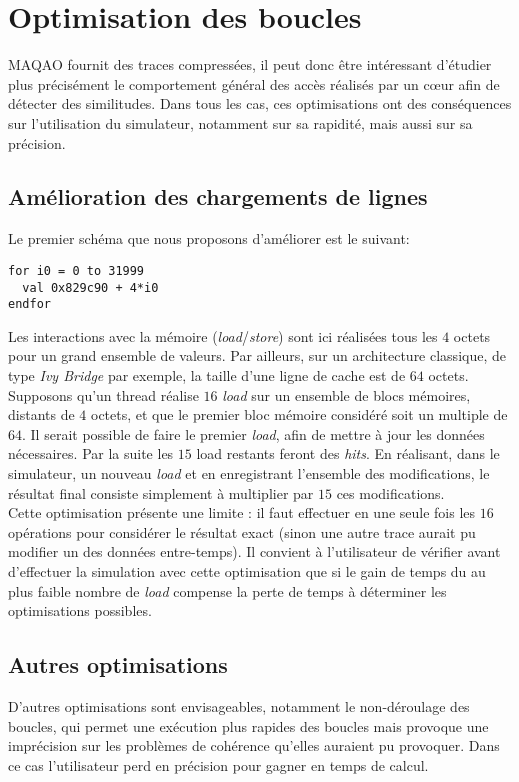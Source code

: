\section{Optimisation des boucles}

\textsc{MAQAO} fournit des traces compressées, il peut donc être intéressant d'étudier plus précisément le comportement général des accès réalisés par un c{\oe}ur afin de détecter des similitudes. Dans tous les cas, ces optimisations ont des conséquences sur l'utilisation du simulateur, notamment sur sa rapidité, mais aussi sur sa précision.

\subsection{Amélioration des chargements de lignes}

Le premier schéma que nous proposons d'améliorer est le suivant:\\
\begin{lstlisting}
for i0 = 0 to 31999
  val 0x829c90 + 4*i0
endfor
\end{lstlisting}

Les interactions avec la mémoire (\emph{load}/\emph{store}) sont ici réalisées tous les $4$ octets pour un grand ensemble de valeurs. Par ailleurs, sur un architecture classique, de type \textit{Ivy Bridge} par exemple, la taille d'une ligne de cache est de $64$ octets. \\

Supposons qu'un thread réalise $16$ \emph{load} sur un ensemble de blocs mémoires, distants de $4$ octets, et que le premier bloc mémoire considéré soit un multiple de $64$. Il serait possible de faire le premier \emph{load}, afin de mettre à jour les données nécessaires. Par la suite les $15$ load restants feront des \emph{hits}. En réalisant, dans le simulateur, un nouveau \emph{load} et en enregistrant l'ensemble des modifications, le résultat final consiste simplement à multiplier par $15$ ces modifications. \\

Cette optimisation présente une limite : il faut effectuer en une seule fois les $16$ opérations pour considérer le résultat exact (sinon une autre trace aurait pu modifier un des données entre-temps). Il convient à l'utilisateur de vérifier avant d'effectuer la simulation avec cette optimisation que si le gain de temps du au plus faible nombre de \emph{load} compense la perte de temps à déterminer les optimisations possibles.

\subsection{Autres optimisations}

D'autres optimisations sont envisageables, notamment le non-déroulage des boucles, qui permet une exécution plus rapides des boucles mais provoque une imprécision sur les problèmes de cohérence qu'elles auraient pu provoquer. Dans ce cas l'utilisateur perd en précision pour gagner en temps de calcul.
